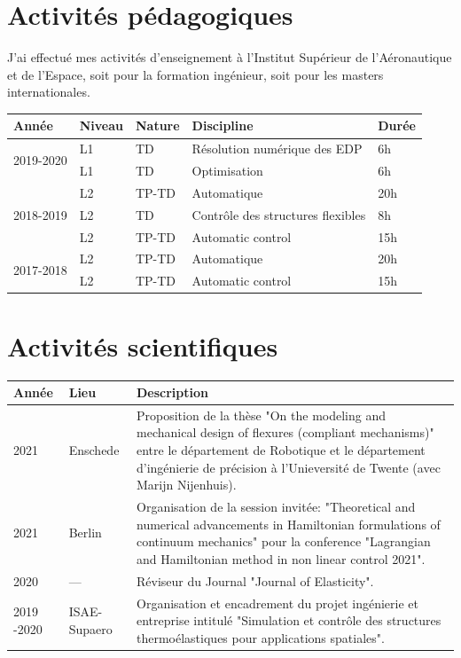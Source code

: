 \documentclass[11pt,a4paper,sans]{moderncv} %
\begin{document}


\section{Activités pédagogiques}
J'ai effectué mes activités d'enseignement à l'Institut Supérieur de l'Aéronautique et de l'Espace, soit pour la formation ingénieur, soit pour les masters internationales.

\begin{tabular}{p{}p{}p{}p{}p{}}
	\hline
	Année & Niveau & Nature  & Discipline & Durée  \\
	\hline
	\multirow{2}{*}{2019-2020} & L1 & TD &  Résolution numérique des EDP & 6h \\
							   & L1 & TD &  Optimisation & 6h \\
	\hline
	\multirow{3}{*}{2018-2019} & L2  & TP-TD  & Automatique & 20h \\
							   & L2  & TD     & Contrôle des structures flexibles & 8h \\
							   & L2  & TP-TD  & Automatic control & 15h \\
	\hline
	\multirow{2}{*}{2017-2018} & L2  & TP-TD  & Automatique & 20h \\
							   & L2  & TP-TD  & Automatic control & 15h \\				   
	\hline
\end{tabular}


\section{Activités scientifiques}

\begin{tabular}{p{}p{}p{}}
	Année & Lieu & Description  \\
	\hline
	2021 & Enschede & Proposition de la thèse "On the modeling and mechanical design of flexures (compliant mechanisms)" entre le département de Robotique et le département d'ingénierie de précision à l'Unieversité de Twente (avec Marijn Nijenhuis). \\
	\hline
	2021  & Berlin & Organisation de la session invitée: "Theoretical and numerical advancements in Hamiltonian formulations of continuum mechanics" pour la conference "Lagrangian and Hamiltonian method in non linear control 2021". \\
	\hline
	2020 & --- & Réviseur du Journal "Journal of Elasticity". \\
	\hline
	2019 -2020 & ISAE-Supaero & Organisation et encadrement du projet ingénierie et entreprise intitulé "Simulation et contrôle des structures thermoélastiques pour
	applications spatiales". \\
	\hline
\end{tabular}
\end{document}
